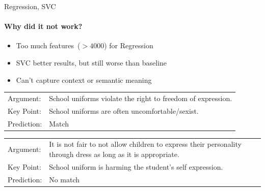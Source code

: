 \documentclass[english,handout]{mlutalk}
\begin{document}
\begin{frame}{Regression, SVC}

  \framesubtitle{Why did it not work?}

  \begin{itemize}
    \item Too much features~(\( > 4000 \)) for Regression
    \item SVC better results, but still worse than baseline
    \item Can't capture context or semantic meaning
  \end{itemize}

  \begin{example}
    \smaller
    \begin{tabular}{ll}
      Argument: & School uniforms violate the right to freedom of expression. \\
      Key Point: & School uniforms are often uncomfortable/sexist. \\
      Prediction: & Match
    \end{tabular}
  \end{example}
  
  \begin{example}
    \smaller
    \begin{tabular}{ll}
      Argument: & It is not fair to not allow children to express their personality through dress as long as it is appropriate. \\
      Key Point: & School uniform is harming the student's self expression. \\
      Prediction: & No match
    \end{tabular}
  \end{example}

\end{frame}
\end{document}
